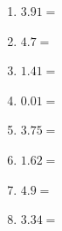 \documentclass[12pt]{article}
\begin{document}
\begin{enumerate}
\item \large $ 3.91 = $ \vspace{1.5cm}
\item \large $ 4.7 = $ \vspace{1.5cm}
\item \large $ 1.41 = $ \vspace{1.5cm}
\item \large $ 0.01 = $ \vspace{1.5cm}
\item \large $ 3.75 = $ \vspace{1.5cm}
\item \large $ 1.62 = $ \vspace{1.5cm}
\item \large $ 4.9 = $ \vspace{1.5cm}
\item \large $ 3.34 = $ \vspace{1.5cm}
\end{enumerate}\newpage
\end{document}
